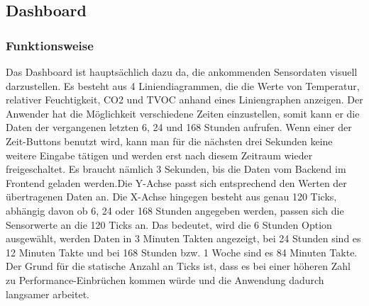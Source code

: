 \documentclass[]{article}
\begin{document}
			\subsection{Dashboard}
			\subsubsection{Funktionsweise}
			Das Dashboard ist hauptsächlich dazu da, die ankommenden Sensordaten visuell darzustellen. Es besteht aus 4 Liniendiagrammen, die die Werte von Temperatur, relativer Feuchtigkeit, CO2 und TVOC anhand eines Liniengraphen anzeigen. Der Anwender hat die Möglichkeit verschiedene Zeiten einzustellen, somit kann er die Daten der vergangenen letzten 6, 24 und 168 Stunden aufrufen.
			Wenn einer der Zeit-Buttons benutzt wird, kann man für die nächsten drei Sekunden keine weitere Eingabe tätigen und werden erst nach diesem Zeitraum wieder freigeschaltet. Es braucht nämlich 3 Sekunden, bis die Daten vom Backend im Frontend geladen werden.\newline Die Y-Achse passt sich entsprechend den Werten der übertragenen Daten an. Die X-Achse hingegen besteht aus genau 120 Ticks, abhängig davon ob 6, 24 oder 168 Stunden angegeben werden, passen sich die Sensorwerte an die 120 Ticks an. Das bedeutet, wird die 6 Stunden Option ausgewählt, werden Daten in 3 Minuten Takten angezeigt, bei 24 Stunden sind es 12 Minuten Takte und bei 168 Stunden bzw. 1 Woche sind es 84 Minuten Takte. Der Grund für die statische Anzahl an Ticks ist, dass es bei einer höheren Zahl zu Performance-Einbrüchen kommen würde und die Anwendung dadurch langsamer arbeitet.\newline
\end{document}
